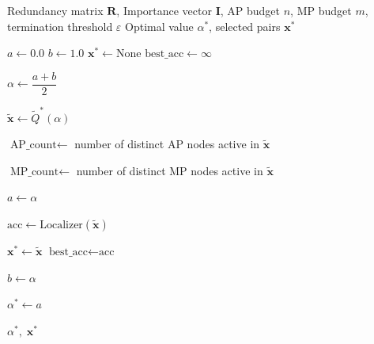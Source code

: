 \documentclass[12pt]{article}
\begin{document}
\begin{algorithm}
\caption{Binary Search for Optimal $\alpha$}
\begin{algorithmic}[1]

\Require Redundancy matrix $\mathbf{R}$, Importance vector $\mathbf{I}$,
         AP budget $n$, MP budget $m$, termination threshold $\varepsilon$
\Ensure Optimal value $\alpha^*$, selected pairs $\mathbf{x}^*$

\State $a \leftarrow 0.0$
\State $b \leftarrow 1.0$
\State $\mathbf{x}^* \leftarrow \text{None}$
\State $\text{best\_acc} \leftarrow \infty$ 


    \State $\alpha \leftarrow \dfrac{a + b}{2}$

    \State $\tilde{\mathbf{x}} \leftarrow \tilde{Q}^*(\alpha)$

    \State $\text{AP\_count} \leftarrow$ number of distinct AP nodes active in $\tilde{\mathbf{x}}$

    \State $\text{MP\_count} \leftarrow$ number of distinct MP nodes active in $\tilde{\mathbf{x}}$

        \State $a \leftarrow \alpha$

        \State $\text{acc} \leftarrow \text{Localizer}(\tilde{\mathbf{x}})$

            \State $\mathbf{x}^* \leftarrow \tilde{\mathbf{x}}$
            \State $\text{best\_acc} \leftarrow \text{acc}$
        \EndIf

    \Else
        \State $b \leftarrow \alpha$
    \EndIf

\EndWhile

\State $\alpha^* \leftarrow a$ 

\Return $\alpha^*,\; \mathbf{x}^*$

\end{algorithmic}
\end{algorithm}
\end{document}

